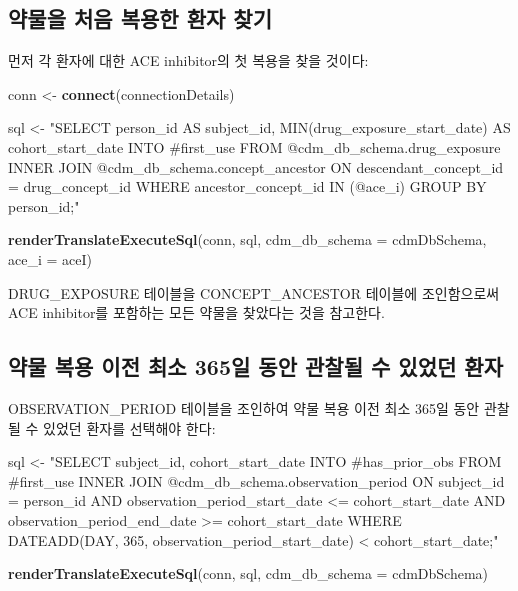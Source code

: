 \documentclass[10.5pt]{book}
\newenvironment{Shaded}{\begin{snugshade}}{\end{snugshade}}
\newcommand{\KeywordTok}[1]{\textcolor[rgb]{0.13,0.29,0.53}{\textbf{#1}}}
\newcommand{\DataTypeTok}[1]{\textcolor[rgb]{0.13,0.29,0.53}{#1}}
\newcommand{\StringTok}[1]{\textcolor[rgb]{0.31,0.60,0.02}{#1}}
\newcommand{\NormalTok}[1]{#1}
\theoremstyle{definition}
\theoremstyle{definition}
\theoremstyle{definition}
\theoremstyle{remark}
\begin{document}
\subsection{약물을 처음 복용한 환자 찾기}\label{----}

먼저 각 환자에 대한 ACE inhibitor의 첫 복용을 찾을 것이다:

\begin{Shaded}
\begin{Highlighting}[]
\NormalTok{conn <-}\StringTok{ }\KeywordTok{connect}\NormalTok{(connectionDetails)}

\NormalTok{sql <-}\StringTok{ "SELECT person_id AS subject_id,}
\StringTok{  MIN(drug_exposure_start_date) AS cohort_start_date}
\StringTok{INTO #first_use}
\StringTok{FROM @cdm_db_schema.drug_exposure}
\StringTok{INNER JOIN @cdm_db_schema.concept_ancestor}
\StringTok{  ON descendant_concept_id = drug_concept_id}
\StringTok{WHERE ancestor_concept_id IN (@ace_i)}
\StringTok{GROUP BY person_id;"}

\KeywordTok{renderTranslateExecuteSql}\NormalTok{(conn,}
\NormalTok{                          sql,}
                          \DataTypeTok{cdm_db_schema =}\NormalTok{ cdmDbSchema,}
                          \DataTypeTok{ace_i =}\NormalTok{ aceI)}
\end{Highlighting}
\end{Shaded}

DRUG\_EXPOSURE 테이블을 CONCEPT\_ANCESTOR 테이블에 조인함으로써 ACE
inhibitor를 포함하는 모든 약물을 찾았다는 것을 참고한다.

\subsection{약물 복용 이전 최소 365일 동안 관찰될 수 있었던
환자}\label{----365-----}

OBSERVATION\_PERIOD 테이블을 조인하여 약물 복용 이전 최소 365일 동안
관찰될 수 있었던 환자를 선택해야 한다:

\begin{Shaded}
\begin{Highlighting}[]
\NormalTok{sql <-}\StringTok{ "SELECT subject_id,}
\StringTok{  cohort_start_date}
\StringTok{INTO #has_prior_obs}
\StringTok{FROM #first_use}
\StringTok{INNER JOIN @cdm_db_schema.observation_period}
\StringTok{  ON subject_id = person_id}
\StringTok{    AND observation_period_start_date <= cohort_start_date}
\StringTok{    AND observation_period_end_date >= cohort_start_date}
\StringTok{WHERE DATEADD(DAY, 365, observation_period_start_date) < cohort_start_date;"}

\KeywordTok{renderTranslateExecuteSql}\NormalTok{(conn, sql, }\DataTypeTok{cdm_db_schema =}\NormalTok{ cdmDbSchema)}
\end{Highlighting}
\end{Shaded}
\end{document}
